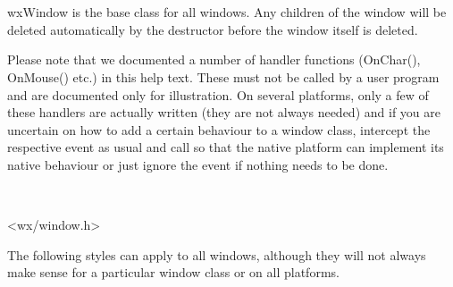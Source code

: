 \section{}\label{wxwindow}

wxWindow is the base class for all windows. Any children of the window will be deleted
automatically by the destructor before the window itself is deleted.

Please note that we documented a number of handler functions (OnChar(), OnMouse() etc.) in this
help text. These must not be called by a user program and are documented only for illustration.
On several platforms, only a few of these handlers are actually written (they are not always
needed) and if you are uncertain on how to add a certain behaviour to a window class, intercept
the respective event as usual and call  so that the native
platform can implement its native behaviour or just ignore the event if nothing needs to be
done.


\\


<wx/window.h>


The following styles can apply to all windows, although they will not always make sense for a particular
window class or on all platforms.

